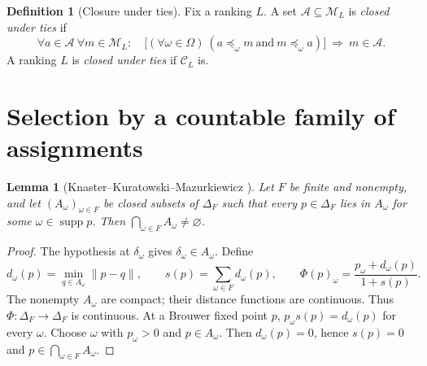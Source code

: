 \documentclass[11pt]{article}
\newtheorem{lemma}[theorem]{Lemma}
\theoremstyle{definition}
\newtheorem{definition}[theorem]{Definition}
\theoremstyle{remark}
\newcommand{\M}{\mathcal M}
\newcommand{\C}{\mathcal C}
\newcommand{\supp}{\operatorname{supp}}
\begin{document}
\begin{definition}[Closure under ties]\label{def:tie-closure}
Fix a ranking $L$. A set $\mathcal A\subseteq\M_L$ is \emph{closed under ties} if
\[
\forall a\in\mathcal A\ \forall m\in\M_L:\quad
\bigl[(\forall\omega\in\Omega)\ (a\preceq_\omega m\ {\text{and}}\ m\preceq_\omega a)\bigr]\ \Longrightarrow\ m\in\mathcal A.
\] A ranking $L$ is \emph{closed under ties} if $\C_L$ is.
\end{definition}

\section{Selection by a countable family of assignments}\label{sec:general}

\begin{lemma}[Knaster--Kuratowski--Mazurkiewicz {\cite{KKM1929}}]\label{lem:kkm}
Let $F$ be finite and nonempty, and let $(A_\omega)_{\omega\in F}$ be closed subsets of $\Delta_F$ such that every $p\in\Delta_F$ lies in $A_\omega$ for some $\omega\in\supp p$. Then $\bigcap_{\omega\in F}A_\omega\ne\varnothing$.
\end{lemma}
\begin{proof}
The hypothesis at $\delta_\omega$ gives $\delta_\omega\in A_\omega$. Define
\[
d_\omega(p)=\min_{q\in A_\omega}\|p-q\|,\qquad
s(p)=\sum_{\omega\in F}d_\omega(p),\qquad
\Phi(p)_\omega=\frac{p_\omega+d_\omega(p)}{1+s(p)}.
\]
The nonempty $A_\omega$ are compact; their distance functions are continuous. Thus $\Phi:\Delta_F\to\Delta_F$ is continuous. At a Brouwer fixed point $p$, $p_\omega s(p)=d_\omega(p)$ for every $\omega$. Choose $\omega$ with $p_\omega>0$ and $p\in A_\omega$. Then $d_\omega(p)=0$, hence $s(p)=0$ and $p\in\bigcap_{\omega\in F}A_\omega$.
\end{proof}
\end{document}
